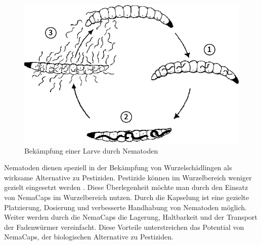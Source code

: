 \begin{figure}
	\includegraphics[draft=false,scale=0.4]{Illustrationen/3-Einleitung/zyklus_nematoden.png}
\caption{Bekämpfung einer Larve durch Nematoden \protect\cite{e-nema}}
\label{fig:zyklus_Nematoden}
\end{figure}

	
Nematoden dienen speziell in der Bekämpfung von Wurzelschädlingen als wirksame Alternative zu Pestiziden. Pestizide können im Wurzelbereich weniger gezielt eingesetzt werden \cite{nfp}. Diese Überlegenheit möchte man durch den Einsatz von NemaCaps im Wurzelbereich nutzen. Durch die Kapselung ist eine gezielte Platzierung, Dosierung und verbesserte Handhabung von Nematoden möglich. Weiter werden durch die NemaCaps die Lagerung, Haltbarkeit und der Transport der Fadenwürmer vereinfacht. Diese Vorteile unterstreichen das Potential von NemaCaps, der biologischen Alternative zu Pestiziden.
